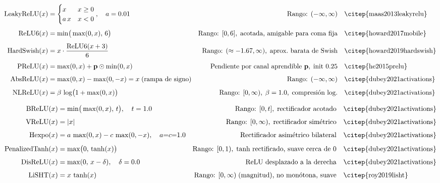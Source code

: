 {\scriptsize
\begin{align}
  \text{LeakyReLU}(x) &= \begin{cases} x & x\ge 0 \\ a\,x & x < 0 \end{cases},
    \quad a=0.01
    & \text{Rango: } (-\infty,\infty)
    & \quad \text{\citep{maas2013leakyrelu}} \\[4pt]
  \text{ReLU6}(x) &= \min\!\big(\max(0,x),\,6\big)
    & \text{Rango: } [0,6],\;\text{acotada, amigable para coma fija}
    & \quad \text{\citep{howard2017mobile}} \\[4pt]
  \text{HardSwish}(x) &= x\cdot\frac{\text{ReLU6}(x+3)}{6}
    & \text{Rango: } (\approx{-1.67},\infty),\;\text{aprox.\ barata de Swish}
    & \quad \text{\citep{howard2019hardswish}} \\[4pt]
  \text{PReLU}(x) &= \max(0,x)+\mathbf{p}\odot\min(0,x)
    & \text{Pendiente por canal aprendible } \mathbf{p},\;\text{init 0.25}
    & \quad \text{\citep{he2015prelu}} \\[4pt]
  \text{AbsReLU}(x) &= \max(0,x)-\max(0,-x) = x\;\text{(rampa de signo)}
    & \text{Rango: } (-\infty,\infty)
    & \quad \text{\citep{dubey2021activations}} \\[4pt]
  \text{NLReLU}(x) &= \beta\,\log\!\big(1+\max(0,x)\big)
    & \text{Rango: } [0,\infty),\;\beta=1.0,\;\text{compresión log.}
    & \quad \text{\citep{dubey2021activations}}
\end{align}
}  %

{\scriptsize
\begin{align}
  \text{BReLU}(x) &= \min\!\big(\max(0,x),\,t\big),\quad t=1.0
    & \text{Rango: } [0,t],\;\text{rectificador acotado}
    & \quad \text{\citep{dubey2021activations}} \\[4pt]
  \text{VReLU}(x) &= |x|
    & \text{Rango: } [0,\infty),\;\text{rectificador simétrico}
    & \quad \text{\citep{dubey2021activations}} \\[4pt]
  \text{Hexpo}(x) &= a\,\max(0,x)-c\,\max(0,-x),\quad a{=}c{=}1.0
    & \text{Rectificador asimétrico bilateral}
    & \quad \text{\citep{dubey2021activations}} \\[4pt]
  \text{PenalizedTanh}(x) &= \max\!\big(0,\,\tanh(x)\big)
    & \text{Rango: } [0,1),\;\text{tanh rectificado, suave cerca de 0}
    & \quad \text{\citep{dubey2021activations}} \\[4pt]
  \text{DisReLU}(x) &= \max(0,\,x-\delta),\quad \delta=0.0
    & \text{ReLU desplazado a la derecha}
    & \quad \text{\citep{dubey2021activations}} \\[4pt]
  \text{LiSHT}(x) &= x\,\tanh(x)
    & \text{Rango: } [0,\infty)\;\text{(magnitud), no monótona, suave}
    & \quad \text{\citep{roy2019lisht}}
\end{align}
}  %

